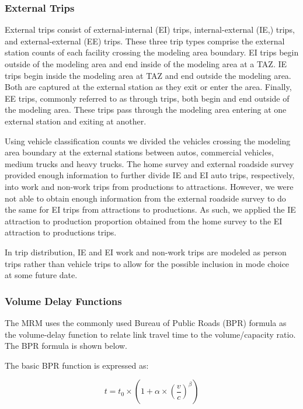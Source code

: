 \documentclass[
]{article}
\begin{document}
\subsubsection{External Trips}\label{external-trips}

External trips consist of external-internal (EI) trips,
internal-external (IE,) trips, and external-external (EE) trips. These
three trip types comprise the external station counts of each facility
crossing the modeling area boundary. EI trips begin outside of the
modeling area and end inside of the modeling area at a TAZ. IE trips
begin inside the modeling area at TAZ and end outside the modeling area.
Both are captured at the external station as they exit or enter the
area. Finally, EE trips, commonly referred to as through trips, both
begin and end outside of the modeling area. These trips pass through the
modeling area entering at one external station and exiting at another.

Using vehicle classification counts we divided the vehicles crossing the
modeling area boundary at the external stations between autos,
commercial vehicles, medium trucks and heavy trucks. The home survey and
external roadside survey provided enough information to further divide
IE and EI auto trips, respectively, into work and non-work trips from
productions to attractions. However, we were not able to obtain enough
information from the external roadside survey to do the same for EI
trips from attractions to productions. As such, we applied the IE
attraction to production proportion obtained from the home survey to the
EI attraction to productions trips.

In trip distribution, IE and EI work and non-work trips are modeled as
person trips rather than vehicle trips to allow for the possible
inclusion in mode choice at some future date.

\subsubsection{Volume Delay Functions}\label{volume-delay-functions}

The MRM uses the commonly used Bureau of Public Roads (BPR) formula as
the volume-delay function to relate link travel time to the
volume/capacity ratio. The BPR formula is shown below.

The basic BPR function is expressed as:

\[
t = t_0 \times \left( 1 + \alpha \times \left( \frac{v}{c} \right)^\beta \right)
\]
\end{document}

